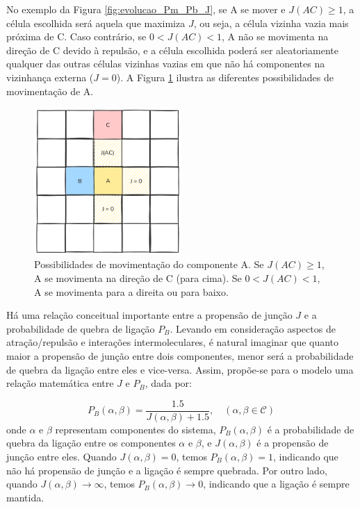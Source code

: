 \documentclass[12pt,oneside]{report}
\begin{document}
No exemplo da Figura \ref{fig:evolucao_Pm_Pb_J}, se A se mover e $J(AC) \geq 1$, a célula escolhida será aquela que maximiza $J$, ou seja, a célula vizinha vazia mais próxima de C. Caso contrário, se $0 < J(AC) < 1$, A não se movimenta na direção de C devido à repulsão, e a célula escolhida poderá ser aleatoriamente qualquer das outras células vizinhas vazias em que não há componentes na vizinhança externa ($J = 0$). A Figura \ref{fig:evolucao_A} ilustra as diferentes possibilidades de movimentação de A.

\begin{figure}[H]
    \centering
    \includegraphics[width=0.5\textwidth]{img/evolucao_A.png}
    \caption{\small Possibilidades de movimentação do componente A. Se $J(AC) \geq 1$, A se movimenta na direção de C (para cima). Se $0 < J(AC) < 1$, A se movimenta para a direita ou para baixo.}
    \label{fig:evolucao_A}
\end{figure}

Há uma relação conceitual importante entre a propensão de junção $J$ e a probabilidade de quebra de ligação $P_B$. Levando em consideração aspectos de atração/repulsão e interações intermoleculares, é natural imaginar que quanto maior a propensão de junção entre dois componentes, menor será a probabilidade de quebra da ligação entre eles e vice-versa. Assim, propõe-se para o modelo uma relação matemática entre $J$ e $P_B$, dada por:

\begin{equation}
    \label{eq:J_PB}
    P_B(\alpha, \beta) = \frac{1.5}{J(\alpha, \beta) + 1.5}, \quad (\alpha, \beta \in \mathcal{C})
\end{equation}
onde $\alpha$ e $\beta$ representam componentes do sistema, $P_B(\alpha, \beta)$ é a probabilidade de quebra da ligação entre os componentes $\alpha$ e $\beta$, e $J(\alpha, \beta)$ é a propensão de junção entre eles. Quando $J(\alpha, \beta) = 0$, temos $P_B(\alpha, \beta) = 1$, indicando que não há propensão de junção e a ligação é sempre quebrada. Por outro lado, quando $J(\alpha, \beta) \to \infty$, temos $P_B(\alpha, \beta) \to 0$, indicando que a ligação é sempre mantida.
\end{document}
